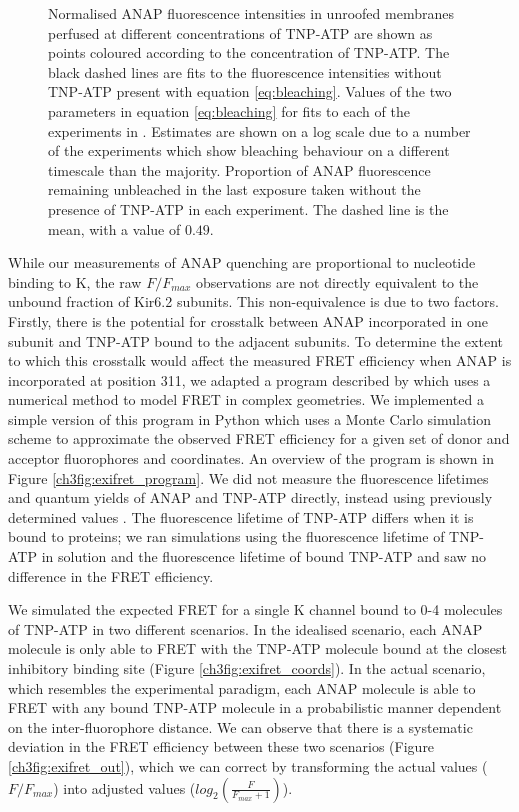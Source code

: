 \begin{figure}[h]
\begin{subfigure}[t]{0.45\textwidth}
	\end{subfigure}
	\caption[Unroofed membranes bleaching correction]{
	 Normalised ANAP fluorescence intensities in unroofed membranes perfused at different concentrations of TNP-ATP are shown as points coloured according to the concentration of TNP-ATP.
	The black dashed lines are fits to the fluorescence intensities without TNP-ATP present with equation \ref{eq:bleaching}.
	 Values of the two parameters in equation \ref{eq:bleaching} for fits to each of the experiments in .
	Estimates are shown on a log scale due to a number of the experiments which show bleaching behaviour on a different timescale than the majority.
	 Proportion of ANAP fluorescence remaining unbleached in the last exposure taken without the presence of TNP-ATP in each experiment.
	The dashed line is the mean, with a value of $0.49$.
	}
\end{figure}

While our measurements of ANAP quenching are proportional to nucleotide binding to K\ATP{}, the raw $F/F_{max}$ observations are not directly equivalent to the unbound fraction of Kir6.2 subunits.
This non-equivalence is due to two factors.
Firstly, there is the potential for crosstalk between ANAP incorporated in one subunit and TNP-ATP bound to the adjacent subunits.
To determine the extent to which this crosstalk would affect the measured FRET efficiency when ANAP is incorporated at position 311, we adapted a program described by \citeauthor{deplazes_exifret_2012} which uses a numerical method to model FRET in complex geometries.
We implemented a simple version of this program in Python which uses a Monte Carlo simulation scheme to approximate the observed FRET efficiency for a given set of donor and acceptor fluorophores and coordinates.
An overview of the program is shown in Figure \ref{ch3fig:exifret_program}.
We did not measure the fluorescence lifetimes and quantum yields of ANAP and TNP-ATP directly, instead using previously determined values \cite{zagotta_measuring_2016-1, ye_spectroscopic_1999, ishikawa_single-molecule_2002}.
The fluorescence lifetime of TNP-ATP differs when it is bound to proteins; we ran simulations using the fluorescence lifetime of TNP-ATP in solution and the fluorescence lifetime of bound TNP-ATP and saw no difference in the FRET efficiency.

We simulated the expected FRET for a single K\ATP{} channel bound to 0-4 molecules of TNP-ATP in two different scenarios.
In the idealised scenario, each ANAP molecule is only able to FRET with the TNP-ATP molecule bound at the closest inhibitory binding site (Figure \ref{ch3fig:exifret_coords}).
In the actual scenario, which resembles the experimental paradigm, each ANAP molecule is able to FRET with any bound TNP-ATP molecule in a probabilistic manner dependent on the inter-fluorophore distance.
We can observe that there is a systematic deviation in the FRET efficiency between these two scenarios (Figure \ref{ch3fig:exifret_out}), which we can correct by transforming the actual values ($F/F_{max}$) into adjusted values ($log_2(\frac{F}{F_{max} + 1})$).

